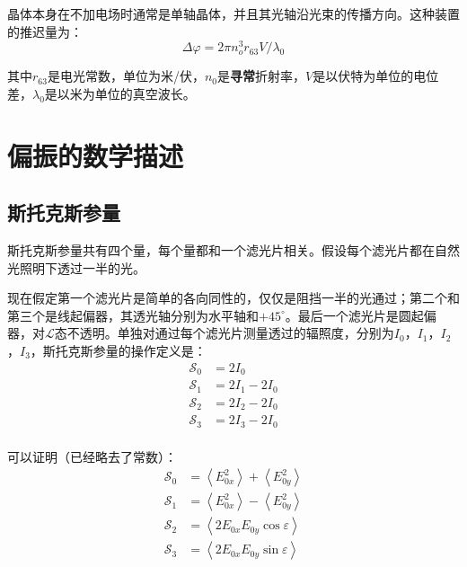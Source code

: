 \documentclass[UTF8]{ctexart}
\newcommand{\backdoc}{\normalsize}
\begin{document}
	晶体本身在不加电场时通常是单轴晶体，并且其光轴沿光束的传播方向。这种装置的推迟量为：
	\begin{equation}
	\Delta \varphi=2 \pi n_{o}^{3} r_{63} V / \lambda_{0}
	\end{equation}
	
	\noindent 其中$r_{63}$是电光常数，单位为米/伏，$n_{0}$是\textbf{寻常}折射率，$V$是以伏特为单位的电位差，$\lambda_{0}$是以米为单位的真空波长。
	
	\section{偏振的数学描述}
	\subsection{斯托克斯参量}
	
	\backdoc
	斯托克斯参量共有四个量，每个量都和一个滤光片相关。假设每个滤光片都在自然光照明下透过一半的光。
	
	现在假定第一个滤光片是简单的各向同性的，仅仅是阻挡一半的光通过；第二个和第三个是线起偏器，其透光轴分别为水平轴和$+45^{\circ}$。最后一个滤光片是圆起偏器，对$\mathscr{L}$态不透明。单独对通过每个滤光片测量透过的辐照度，分别为$I_{0}$，$I_{1}$，$I_{2}$，$I_{3}$，斯托克斯参量的操作定义是：
	\begin{equation}
	\begin{aligned}
	\mathscr{S}_{0}&=2 I_{0}\\
	\mathscr{S}_{1}&=2 I_{1}-2 I_{0}\\
	\mathscr{S}_{2}&=2 I_{2}-2 I_{0}\\
	\mathscr{S}_{3}&=2 I_{3}-2 I_{0}\\
	\end{aligned}
	\end{equation}
	
	可以证明（已经略去了常数）：
	\begin{equation}
	\begin{aligned}
	\mathscr{S}_{0}&=\left\langle E_{0 x}^{2}\right\rangle+\left\langle E_{0 y}^{2}\right\rangle\\
	\mathscr{S}_{1}&=\left\langle E_{0 x}^{2}\right\rangle-\left\langle E_{0 y}^{2}\right\rangle\\
	\mathscr{S}_{2}&=\left\langle 2 E_{0 x} E_{0 y} \cos \varepsilon\right\rangle\\
	\mathscr{S}_{3}&=\left\langle 2 E_{0 x} E_{0 y} \sin \varepsilon\right\rangle\\
	\end{aligned}
	\end{equation}
	
\end{document}

